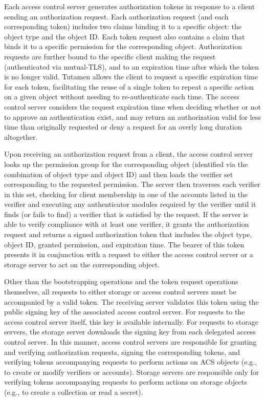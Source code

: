 Each access control server generates authorization tokens in response
to a client sending an authorization request. Each authorization
request (and each corresponding token) includes two claims binding it
to a specific object: the object type and the object ID. Each token
request also contains a claim that binds it to a specific permission
for the corresponding object. Authorization requests are further bound
to the specific client making the request (authenticated via
mutual-TLS), and to an expiration time after which the token is no
longer valid. Tutamen allows the client to request a specific
expiration time for each token, facilitating the reuse of a single
token to repeat a specific action on a given object without needing to
re-authenticate each time. The access control server considers the
request expiration time when deciding whether or not to approve an
authentication exist, and may return an authorization valid for less
time than originally requested or deny a request for an overly long
duration altogether.

Upon receiving an authorization request from a client, the access
control server looks up the permission group for the corresponding
object (identified via the combination of object type and object ID)
and then loads the verifier set corresponding to the requested
permission. The server then traverses each verifier in this set,
checking for client membership in one of the accounts listed in the
verifier and executing any authenticator modules required by the
verifier until it finds (or fails to find) a verifier that is
satisfied by the request. If the server is able to verify compliance
with at least one verifier, it grants the authorization request and
returns a signed authorization token that includes the object type,
object ID, granted permission, and expiration time. The bearer of this
token presents it in conjunction with a request to either the access
control server or a storage server to act on the corresponding object.

Other than the bootstrapping operations and the token request
operations themselves, all requests to either storage or access
control servers must be accompanied by a valid token. The receiving
server validates this token using the public signing key of the
associated access control server. For requests to the access control
server itself, this key is available internally. For requests to
storage servers, the storage server downloads the signing key from
each delegated access control server. In this manner, access control
servers are responsible for granting and verifying authorization
requests, signing the corresponding tokens, and verifying tokens
accompanying requests to perform actions on ACS objects (e.g., to
create or modify verifiers or accounts). Storage servers are
responsible only for verifying tokens accompanying requests to perform
actions on storage objects (e.g., to create a collection or read a
secret).

